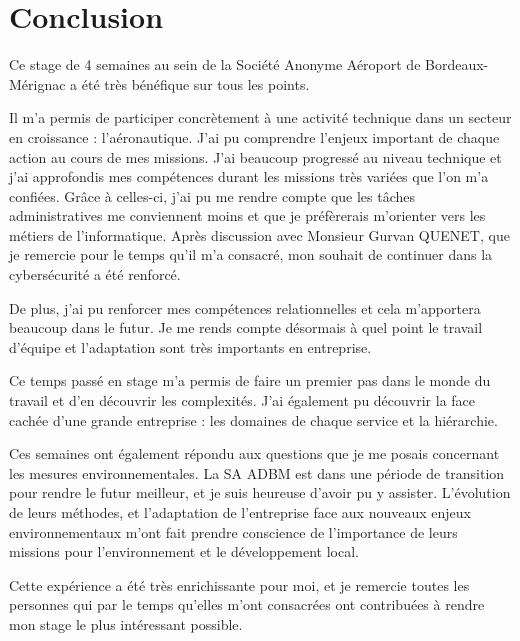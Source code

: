 \chapter{Conclusion}

Ce stage de 4 semaines au sein de la Société Anonyme Aéroport de Bordeaux-Mérignac a été très bénéfique sur tous les points.\newline

Il m'a permis de participer concrètement à une activité technique dans un secteur en croissance : l'aéronautique. J'ai pu comprendre l'enjeux important de chaque action au cours de mes missions. J'ai beaucoup progressé au niveau technique et j'ai approfondis mes compétences durant les missions très variées que l'on m'a confiées. Grâce à celles-ci, j'ai pu me rendre compte que les tâches administratives me conviennent moins et que je préfèrerais m'orienter vers les métiers de l'informatique. Après discussion avec Monsieur Gurvan QUENET, que je remercie pour le temps qu'il m'a consacré, mon souhait de continuer dans la cybersécurité a été renforcé.

De plus, j'ai pu renforcer mes compétences relationnelles et cela m'apportera beaucoup dans le futur. Je me rends compte désormais à quel point le travail d'équipe et l'adaptation sont très importants en entreprise.

Ce temps passé en stage m’a permis de faire un premier pas dans le monde du travail et d’en découvrir les complexités. J’ai également pu découvrir la face cachée d’une grande entreprise : les domaines de chaque service et la hiérarchie.

Ces semaines ont également répondu aux questions que je me posais concernant les mesures environnementales. La SA ADBM est dans une période de transition pour rendre le futur meilleur, et je suis heureuse d'avoir pu y assister. L'évolution de leurs méthodes, et l'adaptation de l'entreprise face aux nouveaux enjeux environnementaux m'ont fait prendre conscience de l'importance de leurs missions pour l'environnement et le développement local.\newline

Cette expérience a été très enrichissante pour moi, et je remercie toutes les personnes qui par le temps qu'elles m'ont consacrées ont contribuées à rendre mon stage le plus intéressant possible.
